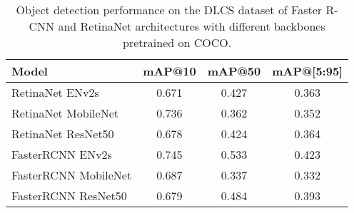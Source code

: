\begin{table}[h]
    \centering
    \begin{tabular}{lccc}
        \hline
        \textbf{Model} & \textbf{mAP@10} & \textbf{mAP@50} & \textbf{mAP@[5:95]} \\
        \hline
        RetinaNet ENv2s      & 0.671 & 0.427 & 0.363 \\
        RetinaNet MobileNet  & 0.736 & 0.362 & 0.352 \\
        RetinaNet ResNet50   & 0.678 & 0.424 & 0.364 \\
        FasterRCNN ENv2s     & 0.745 & 0.533 & 0.423 \\
        FasterRCNN MobileNet & 0.687 & 0.337 & 0.332\\
        FasterRCNN ResNet50  & 0.679 & 0.484 & 0.393 \\
        \hline
    \end{tabular}
    \caption{Object detection performance on the DLCS dataset of Faster R-CNN and RetinaNet architectures with different backbones pretrained on COCO.}
    \label{tab:dlcs-models-not-pretrained}
\end{table}